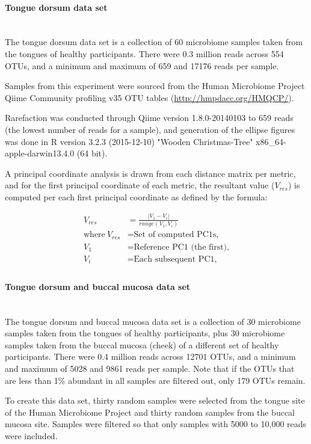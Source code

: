 \documentclass[10pt,letterpaper]{article}
\begin{document}
\paragraph{Tongue dorsum data set}\mbox{}\\
The tongue dorsum data set is a collection of 60 microbiome samples taken from the tongues of healthy participants. There were 0.3 million reads across 554 OTUs, and a minimum and maximum of 659 and 17176 reads per sample.

Samples from this experiment were sourced from the Human Microbiome Project \cite{turnbaugh2007human} Qiime Community profiling v35 OTU tables (\url{http://hmpdacc.org/HMQCP/}).

Rarefaction was conducted through Qiime version 1.8.0-20140103 to 659 reads (the lowest number of reads for a sample), and generation of the ellipse figures was done in R version 3.2.3 (2015-12-10) "Wooden Christmas-Tree" x86\_64-apple-darwin13.4.0 (64 bit).

A principal coordinate analysis is drawn from each distance matrix per metric, and for the first principal coordinate of each metric, the resultant value ($V_{res}$) is computed per each first principal coordinate as defined by the formula:

\begin{align*}
  V_{res} &=\frac{|V_1 - V_i|}{range(V_1, V_i)} \\
  \text{where}~V_{res}&= \text{Set of computed PC1s,} \\
  V_1 &= \text{Reference PC1 (the first),} \\
  V_i &= \text{Each subsequent PC1,} \\
\end{align*}

\paragraph{Tongue dorsum and buccal mucosa data set}\mbox{}\\
The tongue dorsum and buccal mucosa data set is a collection of 30 microbiome samples taken from the tongues of healthy participants, plus 30 microbiome samples taken from the buccal mucosa (cheek) of a different set of healthy participants. There were 0.4 million reads across 12701 OTUs, and a minimum and maximum of 5028 and 9861 reads per sample. Note that if the OTUs that are less than 1\% abundant in all samples are filtered out, only 179 OTUs remain.

To create this data set, thirty random samples were selected from the tongue site of the Human Microbiome Project \cite{turnbaugh2007human} and thirty random samples from the buccal mucosa site. Samples were filtered so that only samples with 5000 to 10,000 reads were included.
\end{document}
